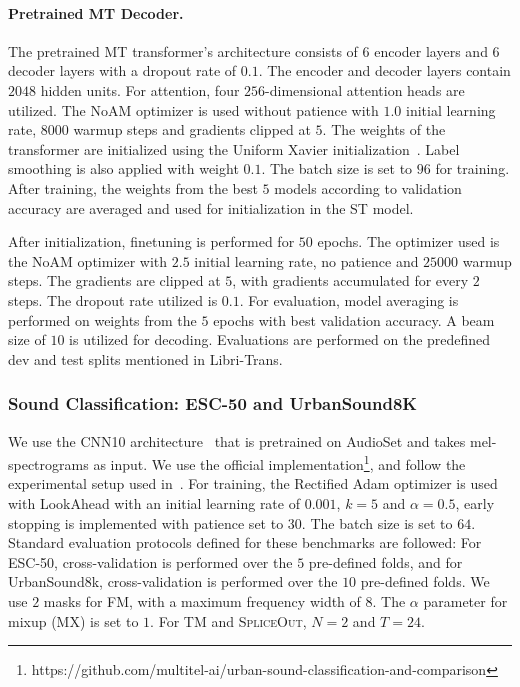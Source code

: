\documentclass{article}
\newcommand{\SpA}{{\textsc{SpliceOut}}\xspace}
\begin{document}
\paragraph{Pretrained MT Decoder.} The pretrained MT transformer's architecture consists of $6$ encoder layers and $6$ decoder layers with a dropout rate of $0.1$. The encoder and decoder layers contain $2048$ hidden units. For attention, four $256$-dimensional attention heads are utilized. The NoAM optimizer is used without patience with $1.0$ initial learning rate, $8000$ warmup steps and gradients clipped at $5$. The weights of the transformer are initialized using the Uniform Xavier initialization~\citep{xavier}. Label smoothing is also applied with weight $0.1$. The batch size is set to $96$ for training. After training, the weights from the best $5$ models according to validation accuracy are averaged and used for initialization in the ST model.

After initialization, finetuning is performed for $50$ epochs. The optimizer used is the NoAM optimizer with $2.5$ initial learning rate, no patience and $25000$ warmup steps. The gradients are clipped at $5$, with gradients accumulated for every $2$ steps. The dropout rate utilized is $0.1$. For evaluation, model averaging is performed on weights from the $5$ epochs with best validation accuracy. A beam size of $10$ is utilized for decoding. Evaluations are performed on the predefined dev and test splits mentioned in Libri-Trans.

\subsubsection{Sound Classification: ESC-50 and UrbanSound8K}
\label{sec:soundclassapp}
We use the CNN10 architecture~\citep{panns} that is pretrained on AudioSet and takes mel-spectrograms as input. We use the official implementation\footnote{https://github.com/multitel-ai/urban-sound-classification-and-comparison}, and follow the experimental setup used in~\citep{urban}. For training, the Rectified Adam optimizer is used with LookAhead with an initial learning rate of $0.001$, $k=5$ and $\alpha=0.5$, early stopping is implemented with patience set to $30$. The batch size is set to $64$. 
Standard evaluation protocols defined for these benchmarks are followed: For ESC-50, cross-validation is performed over the $5$ pre-defined folds, and for UrbanSound8k, cross-validation is performed over the $10$ pre-defined folds. We use $2$ masks for FM, with a maximum frequency width of $8$. The $\alpha$ parameter for mixup (MX) is set to $1$. For TM and \SpA, $N=2$ and $T=24$. 
\end{document}
